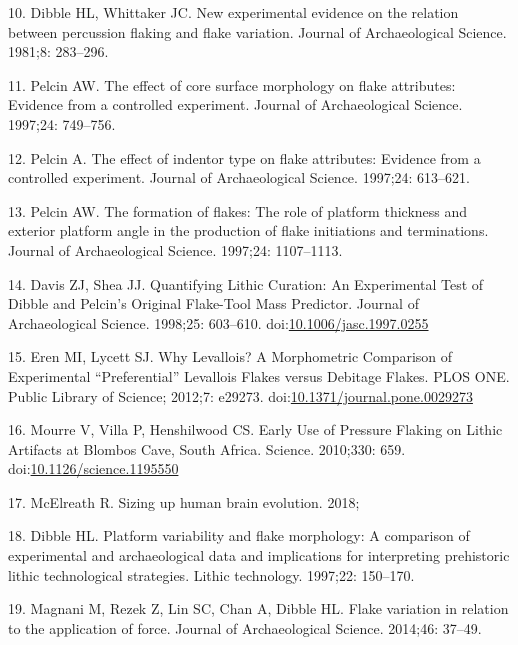 \documentclass[10pt,letterpaper]{article}
\newenvironment{cslreferences}%
  {}%
  {\par}
\begin{document}
\begin{cslreferences}
\leavevmode\hypertarget{ref-dibble_new_1981-1}{}%
10. Dibble HL, Whittaker JC. New experimental evidence on the relation
between percussion flaking and flake variation. Journal of
Archaeological Science. 1981;8: 283--296.

\leavevmode\hypertarget{ref-pelcin_effect_1997}{}%
11. Pelcin AW. The effect of core surface morphology on flake
attributes: Evidence from a controlled experiment. Journal of
Archaeological Science. 1997;24: 749--756.

\leavevmode\hypertarget{ref-pelcin_effect_1997-1}{}%
12. Pelcin A. The effect of indentor type on flake attributes: Evidence
from a controlled experiment. Journal of Archaeological Science.
1997;24: 613--621.

\leavevmode\hypertarget{ref-pelcin_formation_1997}{}%
13. Pelcin AW. The formation of flakes: The role of platform thickness
and exterior platform angle in the production of flake initiations and
terminations. Journal of Archaeological Science. 1997;24: 1107--1113.

\leavevmode\hypertarget{ref-davis_quantifying_1998}{}%
14. Davis ZJ, Shea JJ. Quantifying Lithic Curation: An Experimental Test
of Dibble and Pelcin's Original Flake-Tool Mass Predictor. Journal of
Archaeological Science. 1998;25: 603--610.
doi:\href{https://doi.org/10.1006/jasc.1997.0255}{10.1006/jasc.1997.0255}

\leavevmode\hypertarget{ref-eren_why_2012}{}%
15. Eren MI, Lycett SJ. Why Levallois? A Morphometric Comparison of
Experimental ``Preferential'' Levallois Flakes versus Debitage Flakes.
PLOS ONE. Public Library of Science; 2012;7: e29273.
doi:\href{https://doi.org/10.1371/journal.pone.0029273}{10.1371/journal.pone.0029273}

\leavevmode\hypertarget{ref-mourre_early_2010}{}%
16. Mourre V, Villa P, Henshilwood CS. Early Use of Pressure Flaking on
Lithic Artifacts at Blombos Cave, South Africa. Science. 2010;330: 659.
doi:\href{https://doi.org/10.1126/science.1195550}{10.1126/science.1195550}

\leavevmode\hypertarget{ref-mcelreath_sizing_2018}{}%
17. McElreath R. Sizing up human brain evolution. 2018;

\leavevmode\hypertarget{ref-dibble_platform_1997}{}%
18. Dibble HL. Platform variability and flake morphology: A comparison
of experimental and archaeological data and implications for
interpreting prehistoric lithic technological strategies. Lithic
technology. 1997;22: 150--170.

\leavevmode\hypertarget{ref-magnani_flake_2014-1}{}%
19. Magnani M, Rezek Z, Lin SC, Chan A, Dibble HL. Flake variation in
relation to the application of force. Journal of Archaeological Science.
2014;46: 37--49.


\end{cslreferences}
\end{document}
